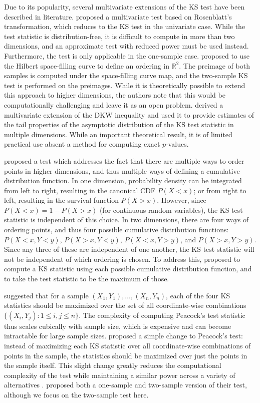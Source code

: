 Due to its popularity, several multivariate extensions of the KS test have been described in literature. \citet{justel_1997} proposed a multivariate test based on Rosenblatt's transformation, which reduces to the KS test in the univariate case. While the test statistic is distribution-free, it is difficult to compute in more than two dimensions, and an approximate test with reduced power must be used instead. Furthermore, the test is only applicable in the one-sample case. \citet{heuchenne_2022} proposed to use the Hilbert space-filling curve to define an ordering in $\mathbb{R}^{2}$. The preimage of both samples is computed under the space-filling curve map, and the two-sample KS test is performed on the preimages. While it is theoretically possible to extend this approach to higher dimensions, the authors note that this would be computationally challenging and leave it as an open problem. \citet{naaman_2021} derived a multivariate extension of the DKW inequality and used it to provide estimates of the tail properties of the asymptotic distribution of the KS test statistic in multiple dimensions. While an important theoretical result, it is of limited practical use absent a method for computing exact $p$-values.

\citet{peacock_1983} proposed a test which addresses the fact that there are multiple ways to order points in higher dimensions, and thus multiple ways of defining a cumulative distribution function. In one dimension, probability density can be integrated from left to right, resulting in the canonical CDF $P(X<x)$; or from right to left, resulting in the survival function $P(X>x)$. However, since $P(X<x)=1-P(X>x)$ (for continuous random variables), the KS test statistic is independent of this choice. In two dimensions, there are four ways of ordering points, and thus four possible cumulative distribution functions: $P(X<x,Y<y)$, $P(X>x,Y<y)$, $P(X<x,Y>y)$, and $P(X>x,Y>y)$. Since any three of these are independent of one another, the KS test statistic will not be independent of which ordering is chosen. To address this, \citet{peacock_1983} proposed to compute a KS statistic using each possible cumulative distribution function, and to take the test statistic to be the maximum of those.

\citet{peacock_1983} suggested that for a sample $(X_{1},Y_{1}),\dots,(X_{n},Y_{n})$, each of the four KS statistics should be maximized over the set of all coordinate-wise combinations $\{(X_{i},Y_{j}):1\leq i,j\leq n\}$. The complexity of computing Peacock's test statistic thus scales cubically with sample size, which is expensive and can become intractable for large sample sizes. \citet{ff1987} proposed a simple change to Peacock's test: instead of maximizing each KS statistic over all coordinate-wise combinations of points in the sample, the statistics should be maximized over just the points in the sample itself. This slight change greatly reduces the computational complexity of the test while maintaining a similar power across a variety of alternatives \citep{ff1987,lopes_2007}. \citet{ff1987} proposed both a one-sample and two-sample version of their test, although we focus on the two-sample test here.

